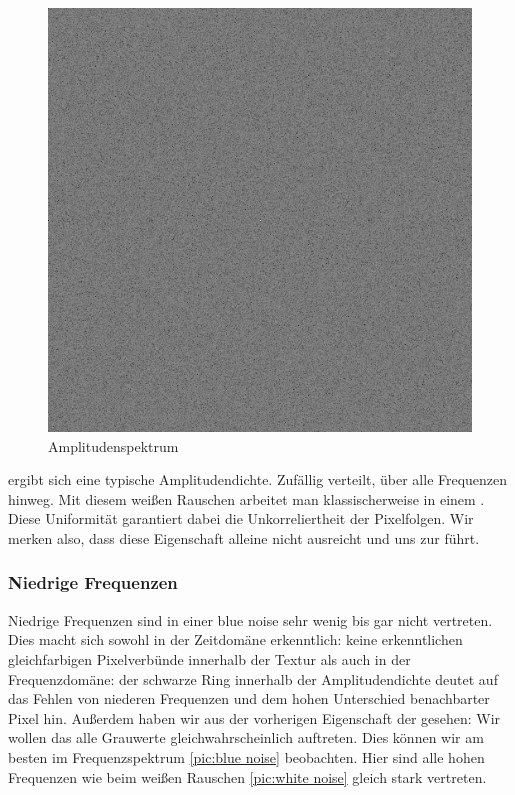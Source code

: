 \begin{figure}[H]
\begin{minipage}[t]{0.45\linewidth}
        \includegraphics[width=\linewidth]{content/BlueNoise/Bilder/FFT_whitenoise.png}
        \caption{Amplitudenspektrum}
    \end{minipage}
\end{figure}

ergibt sich eine typische Amplitudendichte. Zufällig verteilt, über alle 
Frequenzen hinweg. Mit diesem weißen Rauschen arbeitet man klassischerweise in einem .
Diese Uniformität garantiert dabei die Unkorreliertheit der Pixelfolgen. Wir merken also, dass 
diese Eigenschaft alleine nicht ausreicht und uns zur  führt.

\subsubsection{Niedrige Frequenzen}
\label{ch:Content1:sec:blue noise:Niedrige Frequenzen}
Niedrige Frequenzen sind in einer blue noise sehr wenig bis gar nicht 
vertreten. Dies macht sich sowohl in der Zeitdomäne erkenntlich: keine erkenntlichen gleichfarbigen Pixelverbünde 
innerhalb der Textur als auch in der Frequenzdomäne: der schwarze Ring innerhalb der Amplitudendichte
deutet auf das Fehlen von niederen Frequenzen und dem hohen Unterschied benachbarter Pixel hin.
Außerdem haben wir aus der vorherigen Eigenschaft der  gesehen:
Wir wollen das alle Grauwerte gleichwahrscheinlich auftreten. Dies können wir am besten im Frequenzspektrum \ref{pic:blue noise}
beobachten. Hier sind alle hohen Frequenzen wie beim weißen Rauschen \ref{pic:white noise} gleich stark vertreten.

